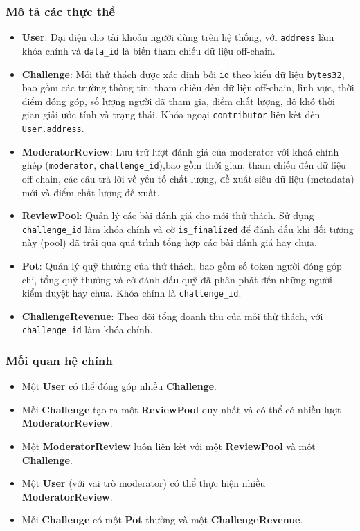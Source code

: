 \subsubsection{Mô tả các thực thể}

\begin{itemize}
  \item \textbf{User}: Đại diện cho tài khoản người dùng trên hệ thống, với \texttt{address} làm khóa chính và \texttt{data\_id} là biến tham chiếu dữ liệu off-chain.
  \item \textbf{Challenge}: Mỗi thử thách được xác định bởi \texttt{id} theo kiểu dữ liệu \texttt{bytes32}, bao gồm các trường thông tin: tham chiếu đến dữ liệu off-chain, lĩnh vực, thời điểm đóng góp, số lượng người đã tham gia, điểm chất lượng, độ khó thời gian giải ước tính và trạng thái. Khóa ngoại \texttt{contributor} liên kết đến \texttt{User.address}.
  \item \textbf{ModeratorReview}: Lưu trữ lượt đánh giá của moderator với khoá chính ghép (\texttt{moderator}, \texttt{challenge\_id}),bao gồm thời gian, tham chiếu đến dữ liệu off-chain, các câu trả lời về yếu tố chất lượng, đề xuất siêu dữ liệu (metadata) mới và điểm chất lượng đề xuất.
  \item \textbf{ReviewPool}: Quản lý các bài đánh giá cho mỗi thử thách. Sử dụng \texttt{challenge\_id} làm khóa chính và cờ \texttt{is\_finalized} để đánh dấu khi đối tượng này (pool) đã trải qua quá trình tổng hợp các bài đánh giá hay chưa.
  \item \textbf{Pot}: Quản lý quỹ thưởng của thử thách, bao gồm số token người đóng góp chi, tổng quỹ thưởng và cờ đánh dấu quỹ đã phân phát đến những người kiểm duyệt hay chưa. Khóa chính là \texttt{challenge\_id}.
  \item \textbf{ChallengeRevenue}: Theo dõi tổng doanh thu của mỗi thử thách, với \texttt{challenge\_id} làm khóa chính.
\end{itemize}

\subsubsection{Mối quan hệ chính}

\begin{itemize}
  \item Một \textbf{User} có thể đóng góp nhiều \textbf{Challenge}.
  \item Mỗi \textbf{Challenge} tạo ra một \textbf{ReviewPool} duy nhất và có thể có nhiều lượt \textbf{ModeratorReview}.
  \item Một \textbf{ModeratorReview} luôn liên kết với một \textbf{ReviewPool} và một \textbf{Challenge}.
  \item Một \textbf{User} (với vai trò moderator) có thể thực hiện nhiều \textbf{ModeratorReview}.
  \item Mỗi \textbf{Challenge} có một \textbf{Pot} thưởng và một \textbf{ChallengeRevenue}.
\end{itemize}

